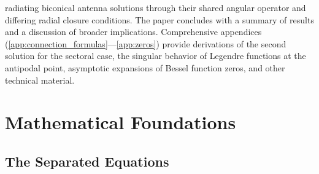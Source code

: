 \documentclass[
  aip,
  amsmath,amssymb,
  preprint
]{revtex4-1}
\begin{document}
radiating biconical antenna solutions through their shared angular operator and differing radial closure conditions. The paper concludes with a summary of results and a discussion of broader implications. Comprehensive appendices (\ref{app:connection_formulas}---\ref{app:zeros}) provide derivations of the second solution for the sectoral case, the singular behavior of Legendre functions at the antipodal point, asymptotic expansions of Bessel function zeros, and other technical material.




\section{Mathematical Foundations}
\label{math}
\subsection{The Separated Equations}
\end{document}
